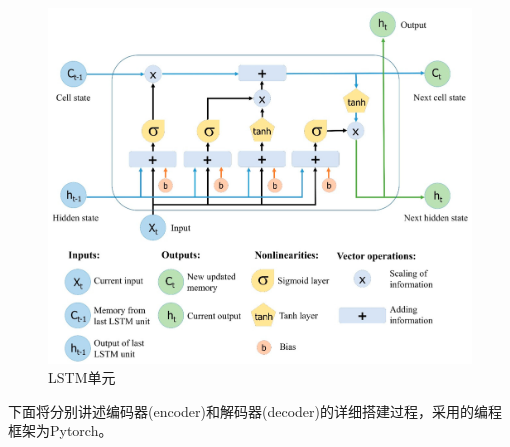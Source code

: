 \documentclass[logo,reportComp]{thesis}
\begin{document}
\begin{figure}[H]
\centering
\includegraphics[width=0.8\linewidth]{fig/lstm-unit.png}
\caption{LSTM单元}
\label{fig:lstm-unit}
\end{figure}

下面将分别讲述编码器(encoder)和解码器(decoder)的详细搭建过程，采用的编程框架为Pytorch。
\end{document}
